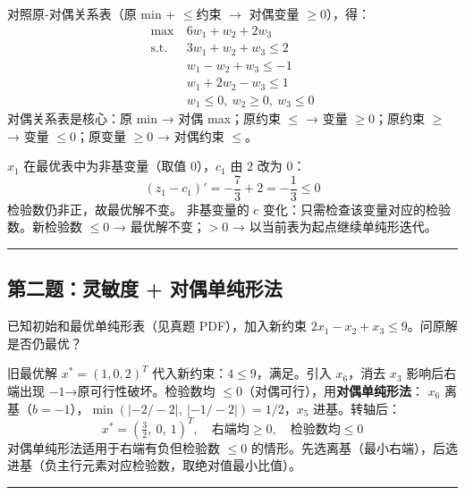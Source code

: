   {对照原-对偶关系表（原 min + $\le$约束 $\to$ 对偶变量 $\ge 0$），得：
  \begin{align*}
    \max\ & 6w_1 + w_2 + 2w_3 \\
    \text{s.t.}\ & 3w_1 + w_2 + w_3 \le 2 \\
    & w_1 - w_2 + w_3 \le -1 \\
    & w_1 + 2w_2 - w_3 \le 1 \\
    & w_1 \le 0,\ w_2 \ge 0,\ w_3 \le 0
  \end{align*}}
  {对偶关系表是核心：原 min → 对偶 max；原约束 $\le$ → 变量 $\ge 0$；原约束 $\ge$ → 变量 $\le 0$；原变量 $\ge 0$ → 对偶约束 $\le$。}
  {\par\vspace{4pt}}
  {$x_1$ 在最优表中为非基变量（取值 $0$），$c_1$ 由 $2$ 改为 $0$：
  \[
  (z_1-c_1)' = -\frac{7}{3} + 2 = -\frac{1}{3} \le 0
  \]
  检验数仍非正，故最优解不变。}
  {非基变量的 $c$ 变化：只需检查该变量对应的检验数。新检验数 $\le 0$ → 最优解不变；$>0$ → 以当前表为起点继续单纯形迭代。}
  {\par\vspace{4pt}}\rule{\textwidth}{0.4pt}

\subsection*{第二题：灵敏度 + 对偶单纯形法}

\noindent 已知初始和最优单纯形表（见真题 PDF），加入新约束 $2x_1 - x_2 + x_3 \le 9$。问原解是否仍最优？

  {旧最优解 $x^*=(1,0,2)^T$ 代入新约束：$4\le 9$，满足。引入 $x_6$，消去 $x_3$ 影响后右端出现 $-1$→原可行性破坏。检验数均 $\le 0$（对偶可行），用\textbf{对偶单纯形法}：
  $x_6$ 离基（$b=-1$），$\min(|-2/-2|,\ |-1/-2|)=1/2$，$x_5$ 进基。转轴后：
  \[
  x^* = (\tfrac{3}{2},\ 0,\ 1)^T,\quad \text{右端均}\ge 0,\quad \text{检验数均}\le 0
  \]}
  {对偶单纯形法适用于右端有负但检验数 $\le 0$ 的情形。先选离基（最小右端），后选进基（负主行元素对应检验数，取绝对值最小比值）。}
  {\par\vspace{4pt}}\rule{\textwidth}{0.4pt}

